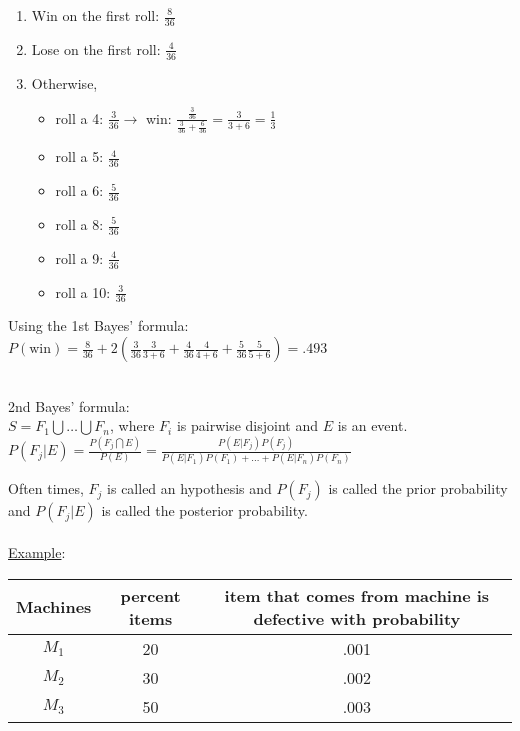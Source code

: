     \begin{enumerate}
      \item Win on the first roll: $\frac{8}{36}$
      \item Lose on the first roll: $\frac{4}{36}$
      \item Otherwise, 
      \begin{itemize}
        \item roll a 4: $\frac{3}{36} \to $ win: $\frac{\frac{3}{36}}{\frac{3}{36} + \frac{6}{36}} = \frac{3}{3+6} = \frac{1}{3}$
        \item roll a 5: $\frac{4}{36}$
        \item roll a 6: $\frac{5}{36}$
        \item roll a 8: $\frac{5}{36}$
        \item roll a 9: $\frac{4}{36}$
        \item roll a 10: $\frac{3}{36}$
      \end{itemize}
    \end{enumerate}
    Using the 1st Bayes' formula: $P(\text{win}) = \frac{8}{36} + 
      2(\frac{3}{36}\frac{3}{3+6} + \frac{4}{36}\frac{4}{4+6} + \frac{5}{36}
      \frac{5}{5+6}) = .493$\\\\
  \begin{theorem}
    2nd Bayes' formula:\\
    $S = F_1 \bigcup \ldots \bigcup F_n$, where $F_i$ is pairwise disjoint and
    $E$ is an event.\\
    $P(F_j | E) = \frac{P(F_j \bigcap E)}{P(E)} = \frac{P(E | F_j)P(F_j)}
      {P(E | F_1)P(F_1) + \ldots + P(E | F_n)P(F_n)}$
  \end{theorem}
  Often times, $F_j$ is called an hypothesis and $P(F_j)$ is called the prior
  probability and $P(F_j | E)$ is called the posterior probability.\\\\
  \underline{Example}:\\
    \begin{tabular}{c | c | c}
      Machines & percent items & item that comes from machine is defective 
        with probability\\
      \hline
      $M_1$ & 20 & .001\\
      \hline
      $M_2$ & 30 & .002\\
      \hline
      $M_3$ & 50 & .003\\
    \end{tabular}\\
